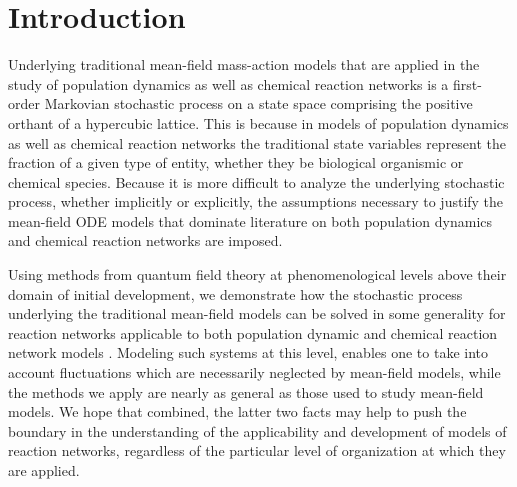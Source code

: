 \section{Introduction}\label{sec:intro}
Underlying traditional mean-field mass-action models that are applied in the study of population dynamics as well as chemical reaction networks is a first-order Markovian stochastic process on a state space comprising the positive orthant of a hypercubic lattice. This is because in models of population dynamics as well as chemical reaction networks the traditional state variables represent the fraction of a given type of entity, whether they be biological organismic or chemical species. Because it is more difficult to analyze the underlying stochastic process, whether implicitly or explicitly, the assumptions necessary to justify the mean-field ODE models that dominate literature on both population dynamics and chemical reaction networks are imposed.


Using methods from quantum field theory at phenomenological levels above their domain of initial development, we demonstrate how the stochastic process underlying the traditional mean-field models can be solved in some generality for reaction networks applicable to both population dynamic and chemical reaction network models \cite{Mattis_1998}. Modeling such systems at this level, enables one to take into account fluctuations which are necessarily neglected by mean-field models, while the methods we apply are nearly as general as those used to study mean-field models. We hope that combined, the latter two facts may help to push the boundary in the understanding of the applicability and development of models of reaction networks, regardless of the particular level of organization at which they are applied.
